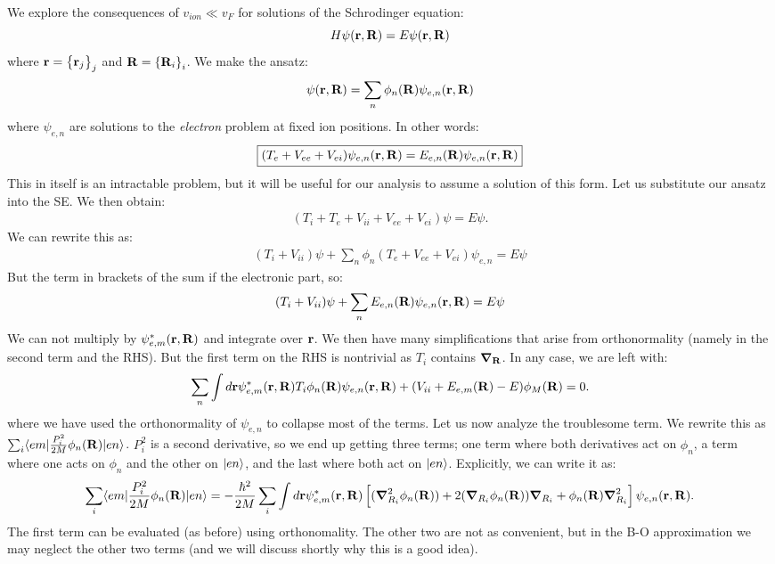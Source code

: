 We explore the consequences of $v_{ion} \ll v_F$ for solutions of the Schrodinger equation:
\begin{equation}\label{eq-SE}
    H\psi(\mathbf{r}, \mathbf{R}) = E\psi(\mathbf{r}, \mathbf{R})
\end{equation}
where $\mathbf{r} = \set{\ensuremath{\mathbf{r}}_j}_j$ and $\mathbf{R} = \set{\ensuremath{\mathbf{R}}_i}_i$. We make the ansatz:
\begin{equation}
    \psi(\mathbf{r}, \mathbf{R}) = \sum_n \phi_n(\mathbf{R})\psi_{e, n}(\mathbf{r}, \mathbf{R})
\end{equation}
where $\psi_{e, n}$ are solutions to the \emph{electron} problem at fixed ion positions. In other words:
\begin{equation}\label{eq-fixedionansatz}
    \boxed{(T_e + V_{ee} + V_{ei})\psi_{e, n}(\mathbf{r}, \mathbf{R}) = E_{e, n}(\mathbf{R})\psi_{e, n}(\mathbf{r}, \mathbf{R})}
\end{equation}
This in itself is an intractable problem, but it will be useful for our analysis to assume a solution of this form. Let us substitute our ansatz into the SE. We then obtain:
\begin{align*}
    (T_i + T_e + V_{ii} + V_{ee} + V_{ei})\psi = E\psi.
\end{align*} 
We can rewrite this as:
\begin{align*}
    (T_i + V_{ii})\psi + \sum_n \phi_n(T_e + V_{ee} + V_{ei})\psi_{e, n} = E\psi
\end{align*}
But the term in brackets of the sum if the electronic part, so:
\begin{equation}
    (T_i + V_{ii})\psi + \sum_n E_{e, n}(\mathbf{R})\psi_{e, n}(\mathbf{r}, \mathbf{R}) = E\psi
\end{equation}
We can not multiply by $\psi^{*}_{e, m}(\mathbf{r}, \mathbf{R})$ and integrate over $\mathbf{r}$. We then have many simplifications that arise from orthonormality (namely in the second term and the RHS). But the first term on the RHS is nontrivial as $T_i$ contains $\nabla_{\v{R}}$. In any case, we are left with:
\begin{equation}
    \sum_n \int d\mathbf{r}\psi^*_{e, m}(\mathbf{r}, \mathbf{R})T_i \phi_n(\mathbf{R})\psi_{e, n}(\mathbf{r}, \mathbf{R}) + (V_{ii} + E_{e, m}(\mathbf{R}) - E)\phi_M(\mathbf{R}) = 0.
\end{equation}
where we have used the orthonormality of $\psi_{e, n}$ to collapse most of the terms. Let us now analyze the troublesome term. We rewrite this as $\sum_{i}\langle em \rvert\frac{P_i^2}{2M}\phi_n(\mathbf{R})\lvert en \rangle$. $P_i^2$ is a second derivative, so we end up getting three terms; one term where both derivatives act on $\phi_n$, a term where one acts on $\phi_n$ and the other on $\lvert en \rangle$, and the last where both act on $\lvert en \rangle$. Explicitly, we can write it as:
\begin{equation}\label{eq-problematicterm}
    \sum_{i}\bra{em}\frac{P_i^2}{2M}\phi_n(\v{R})\ket{en} = -\frac{\hbar^2}{2M}\sum_i \int d\v{r}\psi^*_{e, m}(\v{r}, \v{R})\left[(\nabla_{R_i}^2\phi_n(\v{R})) + 2(\nabla_{R_i}\phi_n(\v{R}))\nabla_{R_i} + \phi_n(\v{R})\nabla_{R_i}^2\right]\psi_{e, n}(\v{r}, \v{R}).
\end{equation}
The first term can be evaluated (as before) using orthonomality. The other two are not as convenient, but in the B-O approximation we may neglect the other two terms (and we will discuss shortly why this is a good idea).

